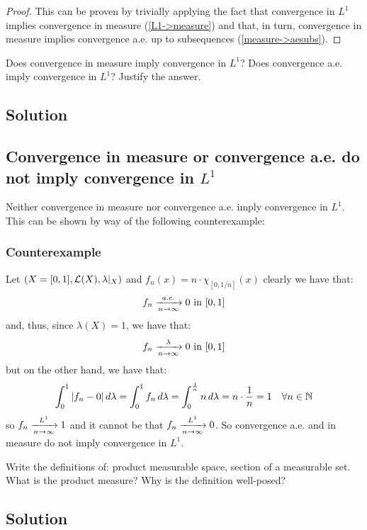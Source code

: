 \begin{proof}
    This can be proven by trivially applying the fact that convergence in $L^1$ implies convergence in measure (\ref{L1->measure}) and that, in turn, convergence in measure implies convergence a.e. up to subsequences (\ref{measure->aesubs}).
\end{proof}


\question
Does convergence in measure imply convergence in $L^1$? Does convergence a.e. imply convergence in $L^1$? Justify the answer.

\subsection*{Solution}

\subsection{Convergence in measure or convergence a.e. do not imply convergence in \texorpdfstring{$L^1$}{L1}}
Neither convergence in measure nor convergence a.e. imply convergence in $L^1$. This can be shown by way of the following counterexample:

\subsubsection{Counterexample}
Let $(X=[0,1], \mathcal{L}(X), \lambda|_X)$ and $f_n(x) = n \cdot \chi_{[0,1/n]}(x)$ clearly we have that:
\[
    f_n \xrightarrow[n\to\infty]{a.e.} 0 \text{ in } [0,1]    
\]
and, thus, since $\lambda(X)=1$, we have that:
\[
    f_n \xrightarrow[n\to\infty]{\lambda} 0 \text{ in } [0,1]
\]
but on the other hand, we have that:
\[
    \int_0^1 |f_n-0| \, d\lambda = \int_0^1 f_n \, d\lambda = \int_0^{\frac{1}{n}} n \, d\lambda = n \cdot \frac{1}{n} = 1 \quad \forall n \in \mathbb{N}    
\]
so $f_n \xrightarrow[n\to\infty]{L^1} 1$ and it cannot be that $f_n \xrightarrow[n\to\infty]{L^1} 0$. So convergence a.e. and in measure do not imply convergence in $L^1$.


\question
Write the definitions of: product measurable space, section of a measurable set. What is the product measure? Why is the definition well-posed?

\subsection*{Solution}

